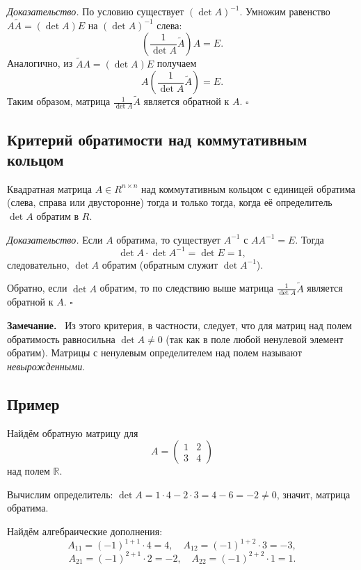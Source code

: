\documentclass[a4paper,12pt]{article}
\newcommand{\myremark}{\textbf{Замечание.}\ }
\theoremstyle{definition}
\theoremstyle{plain}
\theoremstyle{remark}
\begin{document}
	\medskip
	\textit{Доказательство.}
	По условию существует \( (\det A)^{-1} \). Умножим равенство \( A \tilde{A} = (\det A) E \) на \( (\det A)^{-1} \) слева:
	\[
	\left( \frac{1}{\det A} \tilde{A} \right) A = E.
	\]
	Аналогично, из \( \tilde{A} A = (\det A) E \) получаем
	\[
	A \left( \frac{1}{\det A} \tilde{A} \right) = E.
	\]
	Таким образом, матрица \( \frac{1}{\det A} \tilde{A} \) является обратной к \( A \). \hfill \(\square\)
	
	\subsection{Критерий обратимости над коммутативным кольцом}
	
	\begin{tcolorbox}[colback=yellow!5, colframe=orange!50!black, title=Теорема (Критерий обратимости)]
		Квадратная матрица \( A \in R^{n \times n} \) над коммутативным кольцом с единицей обратима (слева, справа или двусторонне) тогда и только тогда, когда её определитель \( \det A \) обратим в \( R \).
	\end{tcolorbox}
	
	\medskip
	\textit{Доказательство.}
	Если \( A \) обратима, то существует \( A^{-1} \) с \( A A^{-1} = E \). Тогда
	\[
	\det A \cdot \det A^{-1} = \det E = 1,
	\]
	следовательно, \( \det A \) обратим (обратным служит \( \det A^{-1} \)).
	
	Обратно, если \( \det A \) обратим, то по следствию выше матрица \( \frac{1}{\det A} \tilde{A} \) является обратной к \( A \). \hfill \(\square\)
	
	\myremark
	Из этого критерия, в частности, следует, что для матриц над полем обратимость равносильна \( \det A \neq 0 \) (так как в поле любой ненулевой элемент обратим). Матрицы с ненулевым определителем над полем называют \textit{невырожденными}.
	
	\subsection{Пример}
	
	Найдём обратную матрицу для
	\[
	A = \begin{pmatrix} 1 & 2 \\ 3 & 4 \end{pmatrix}
	\]
	над полем \( \mathbb{R} \).
	
	Вычислим определитель: \( \det A = 1\cdot4 - 2\cdot3 = 4 - 6 = -2 \neq 0 \), значит, матрица обратима.
	
	Найдём алгебраические дополнения:
	\[
	A_{11} = (-1)^{1+1} \cdot 4 = 4, \quad A_{12} = (-1)^{1+2} \cdot 3 = -3,
	\]
	\[
	A_{21} = (-1)^{2+1} \cdot 2 = -2, \quad A_{22} = (-1)^{2+2} \cdot 1 = 1.
	\]
	
\end{document}
